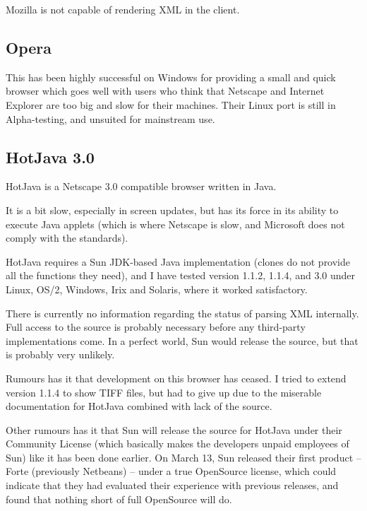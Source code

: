 \textsf{Mozilla is not capable of rendering XML in the client}.


\subsection{Opera}
\label{sec:opera}

This  has been highly
successful on Windows for providing a small and quick browser which
goes well with users who think that Netscape and Internet Explorer are
too big and slow for their machines.  Their Linux port is still in
Alpha-testing, and unsuited for mainstream use.


\subsection{HotJava 3.0}
\label{sec:hotjava}

HotJava is a Netscape 3.0 compatible browser written in Java.

It is a bit slow, especially in screen updates, but has its force in
its ability to execute Java applets (which is where Netscape is slow,
and Microsoft does not comply with the standards).

HotJava requires a Sun JDK-based Java implementation (clones do not
provide all the functions they need), and I have tested version 1.1.2,
1.1.4, and 3.0 under Linux, OS/2, Windows, Irix and Solaris, where it
worked satisfactory.

There is currently no information regarding the status of parsing XML
internally.  Full access to the source is probably necessary before
any third-party implementations come.  In a perfect world, Sun would
release the source, but that is probably very unlikely.

Rumours has it that development on this browser has ceased.  I tried
to extend version 1.1.4 to show TIFF files, but had to give up due to
the miserable documentation for HotJava combined with lack of the
source.

Other rumours has it that Sun will release the source for HotJava
under their Community License (which basically makes the developers
unpaid employees of Sun) like it has been done earlier.  On March 13,
Sun released their first product -- Forte (previously Netbeans) --
under a true OpenSource license, which could indicate that they had
evaluated their experience with previous releases, and found that
nothing short of full OpenSource will do.

